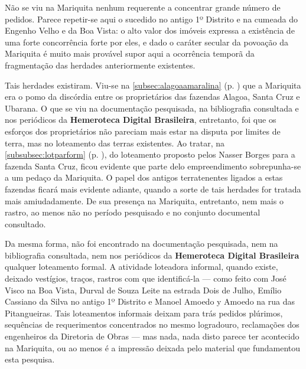 
Não se viu na Mariquita nenhum requerente a concentrar grande número de pedidos. Parece repetir-se aqui o sucedido no antigo 1º Distrito e na cumeada do Engenho Velho e da Boa Vista: o alto valor dos imóveis expressa a existência de uma forte concorrência forte por eles, e dado o caráter secular da povoação da Mariquita é muito mais provável supor aqui a ocorrência temporã da fragmentação das herdades anteriormente existentes.

Tais herdades existiram. Viu-se na \autoref{subsec:alagoaamaralina} (p. \pageref{subsec:alagoaamaralina}) que a Mariquita era o pomo da discórdia entre os proprietários das fazendas Alagoa, Santa Cruz e Ubarana. O que se viu na documentação pesquisada, na bibliografia consultada e nos periódicos da \textbf{Hemeroteca Digital Brasileira}, entretanto, foi que os esforços dos proprietários não pareciam mais estar na disputa por limites de terra, mas no loteamento das terras existentes. Ao tratar, na \autoref{subsubsec:lotparform} (p. \pageref{subsubsec:lotparform}), do loteamento proposto pelos Nasser Borges para a fazenda Santa Cruz, ficou evidente que parte delo empreendimento sobrepunha-se a um pedaço da Mariquita. O papel dos antigos terratenentes ligados a estas fazendas ficará mais evidente adiante, quando a sorte de tais herdades for tratada mais amiudadamente. De sua presença na Mariquita, entretanto, nem mais o rastro, ao menos não no período pesquisado e no conjunto documental consultado.


Da mesma forma, não foi encontrado na documentação pesquisada, nem na bibliografia consultada, nem nos periódicos da \textbf{Hemeroteca Digital Brasileira} qualquer loteamento formal. A atividade loteadora informal, quando existe, deixado vestígios, traços, rastros com que identificá-la --- como feito com José Visco na Boa Vista, Durval de Souza Leite na estrada Dois de Julho, Emílio Cassiano da Silva no antigo 1º Distrito e Manoel Amoedo y Amoedo na rua das Pitangueiras. Tais loteamentos informais deixam para trás pedidos plúrimos, sequências de requerimentos concentrados no mesmo logradouro, reclamações dos engenheiros da Diretoria de Obras --- mas nada, nada disto parece ter acontecido na Mariquita, ou ao menos é a impressão deixada pelo material que fundamentou esta pesquisa. 


